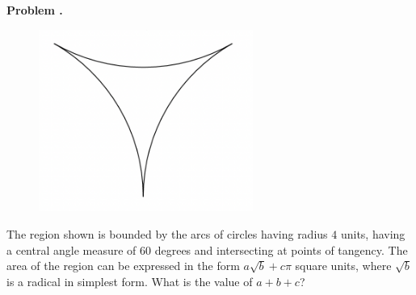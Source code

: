 \documentclass[11pt,letterpape, fleqn]{article}
\newcounter{problem}
\newcommand{\problem}{
	\stepcounter{problem}%
	\noindent \textbf{Problem \theproblem. }%
}
\begin{document}

\begin{minipage}{\textwidth}
    \problem

	\begin{figure}
		\includegraphics[width = 7cm]{images/q5.png}
   \end{figure}
   \noindent The region shown is bounded by the arcs of circles having radius $4$ units, having a central angle measure of $60$ degrees and intersecting at points of tangency. The area of the region can be expressed in the form $a\sqrt{b}+c\pi$ square units, where $\sqrt{b}$ is a radical in simplest form. What is the value of $a + b + c$?

   \vspace{7cm}
\end{minipage}




\vspace{6cm}
\end{document}
